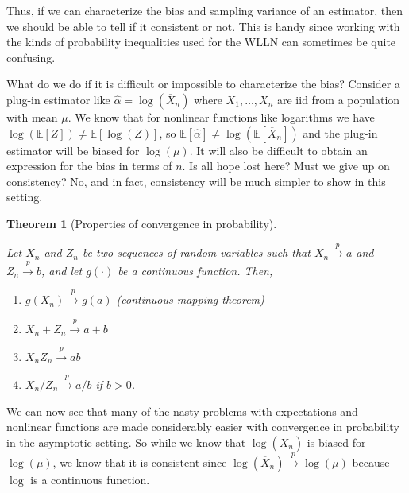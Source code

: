 \documentclass[
  letterpaper,
  DIV=11,
  numbers=noendperiod]{scrreprt}
\providecommand{\tightlist}{%
  \setlength{\itemsep}{0pt}\setlength{\parskip}{0pt}}\usepackage{longtable,booktabs,array}
\newcommand{\E}{\mathbb{E}}
\newcommand{\Xbar}{\overline{X}}
\newcommand{\inprob}{\overset{p}{\to}}
\theoremstyle{definition}
\theoremstyle{plain}
\newtheorem{theorem}{Theorem}[chapter]
\theoremstyle{definition}
\theoremstyle{remark}
\begin{document}
Thus, if we can characterize the bias and sampling variance of an
estimator, then we should be able to tell if it consistent or not. This
is handy since working with the kinds of probability inequalities used
for the WLLN can sometimes be quite confusing.

What do we do if it is difficult or impossible to characterize the bias?
Consider a plug-in estimator like \(\widehat{\alpha} = \log(\Xbar_n)\)
where \(X_1, \ldots, X_n\) are iid from a population with mean \(\mu\).
We know that for nonlinear functions like logarithms we have
\(\log\left(\E[Z]\right) \neq \E[\log(Z)]\), so
\(\E[\widehat{\alpha}] \neq \log(\E[\Xbar_n])\) and the plug-in
estimator will be biased for \(\log(\mu)\). It will also be difficult to
obtain an expression for the bias in terms of \(n\). Is all hope lost
here? Must we give up on consistency? No, and in fact, consistency will
be much simpler to show in this setting.

\leavevmode{}%
\begin{theorem}[Properties of convergence in
probability]\label{thm-inprob-properties}

Let \(X_n\) and \(Z_n\) be two sequences of random variables such that
\(X_n \inprob a\) and \(Z_n \inprob b\), and let \(g(\cdot)\) be a
continuous function. Then,

\begin{enumerate}
\def\labelenumi{\arabic{enumi}.}
\tightlist
\item
  \(g(X_n) \inprob g(a)\) (continuous mapping theorem)
\item
  \(X_n + Z_n \inprob a + b\)
\item
  \(X_nZ_n \inprob ab\)
\item
  \(X_n/Z_n \inprob a/b\) if \(b > 0\).
\end{enumerate}

\end{theorem}

We can now see that many of the nasty problems with expectations and
nonlinear functions are made considerably easier with convergence in
probability in the asymptotic setting. So while we know that
\(\log(\Xbar_n)\) is biased for \(\log(\mu)\), we know that it is
consistent since \(\log(\Xbar_n) \inprob \log(\mu)\) because \(\log\) is
a continuous function.
\end{document}
